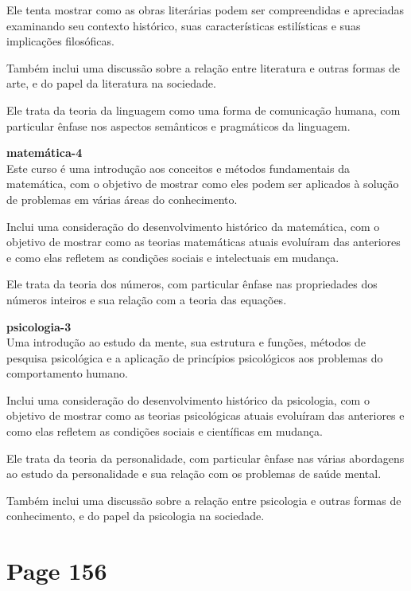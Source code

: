 \documentclass[a4paper]{article}
\begin{document}
Ele tenta mostrar como as obras literárias podem ser compreendidas e apreciadas examinando seu contexto histórico, suas características estilísticas e suas implicações filosóficas.

Também inclui uma discussão sobre a relação entre literatura e outras formas de arte, e do papel da literatura na sociedade.

Ele trata da teoria da linguagem como uma forma de comunicação humana, com particular ênfase nos aspectos semânticos e pragmáticos da linguagem.
\normalsize

\vspace{1.5em}

\textbf{matemática-4} \\
\small
Este curso é uma introdução aos conceitos e métodos fundamentais da matemática, com o objetivo de mostrar como eles podem ser aplicados à solução de problemas em várias áreas do conhecimento.

Inclui uma consideração do desenvolvimento histórico da matemática, com o objetivo de mostrar como as teorias matemáticas atuais evoluíram das anteriores e como elas refletem as condições sociais e intelectuais em mudança.

Ele trata da teoria dos números, com particular ênfase nas propriedades dos números inteiros e sua relação com a teoria das equações.
\normalsize

\vspace{1.5em}

\textbf{psicologia-3} \\
\small
Uma introdução ao estudo da mente, sua estrutura e funções, métodos de pesquisa psicológica e a aplicação de princípios psicológicos aos problemas do comportamento humano.

Inclui uma consideração do desenvolvimento histórico da psicologia, com o objetivo de mostrar como as teorias psicológicas atuais evoluíram das anteriores e como elas refletem as condições sociais e científicas em mudança.

Ele trata da teoria da personalidade, com particular ênfase nas várias abordagens ao estudo da personalidade e sua relação com os problemas de saúde mental.

Também inclui uma discussão sobre a relação entre psicologia e outras formas de conhecimento, e do papel da psicologia na sociedade.
\normalsize

\vfill %

\newpage
\section*{Page 156}
\end{document}
